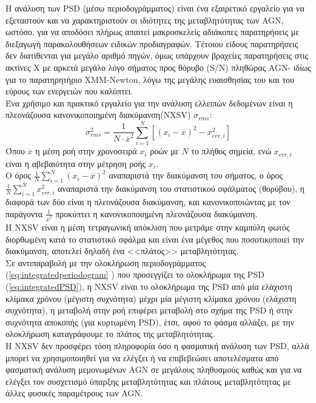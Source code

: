 Η ανάλυση των \textlatin{PSD} (μέσω περιοδογράμματος) είναι ένα εξαιρετικό εργαλείο για να εξεταστούν και να χαρακτηριστούν οι ιδιότητες της μεταβλητότητας των \textlatin{AGN}, ωστόσο, για να αποδόσει πλήρως απαιτεί μακροσκελείς αδιάκοπες παρατηρήσεις με διεξαγωγή παρακολουθήσεων ειδικών προδιαγραφών. Τέτοιου είδους παρατηρήσεις δεν διατίθενται για μεγάλο αριθμό πηγών, όμως υπάρχουν βραχείες παρατηρήσεις στις ακτίνες Χ με αρκετά μεγάλο λόγο σήματος προς θόρυβο (\textlatin{S/N}) πληθώρας \textlatin{AGN}- ιδίως για το παρατηρητήριο \textlatin{XMM-Newton}, λόγω της μεγάλης ευαισθησίας του και του εύρους των ενεργειών που καλύπτει. \\
Ένα χρήσιμο και πρακτικό εργαλείο για την ανάλυση ελλειπών δεδομένων είναι η πλεονάζουσα κανονικοποιημένη διακύμανση(\textlatin{NXSV}) $\sigma_{rms}$:
\begin{equation} \sigma^2_{rms} = \frac{1}{N \cdot {\overline{x}}^2 }   \sum_{i=1}^{N}  [ (x_i -\overline x)^2  - x_{err, i}^2]  \label{eq:NXSVformula}\end{equation}
Όπου $\overline x$ η μέση ροή στην χρονοσειρά $x_i$ ροών με $Ν$ το πλήθος σημεία, ενώ $x_{err, i}$ είναι η αβεβαιότητα στην μέτρηση ροής $x_i$. \\
Ο όρος $ \frac{1}{N }   \sum_{i=1}^{N}   (x_i -\overline x)^2  $ αναπαριστά την διακύμανση του σήματος, ο όρος $ \frac{1}{N }   \sum_{i=1}^{N}  x_{err, i}^2 $ αναπαριστά την διακύμανση του στατιστικού σφάλματος (θορύβου), η διαφορά των δύο είναι η πλεονάζουσα διακύμανση, και κανονικοποιώντας με τον παράγοντα $ \frac{1}{{\overline{x}}^2 }$ προκύπτει η κανονικοποιημένη πλεονάζουσα διακύμανση.\\
Η \textlatin{NXSV} είναι η μέση τετραγωνική απόκλιση που μετράμε στην καμπύλη φωτός διορθωμένη κατά το στατιστικό σφάλμα και είναι ένα μέγεθος που ποσοτικοποιεί την διακύμανση, αποτελεί δηλαδή ένα <<πλάτος>> μεταβλητότητας\cite{2004ApJ...611...93P}.\\
Σε αντιπαραβολή με την ολοκλήρωση περιοδογράμματος (\ref{eq:integratedperiodogram} ) που προσεγγίζει το ολοκλήρωμα της \textlatin{PSD} (\ref{eq:integratedPSD}), η \textlatin{NXSV} είναι το ολοκλήρωμα της \textlatin{PSD} από μία ελάχιστη κλίμακα χρόνου (μέγιστη συχνότητα) μέχρι μία μέγιστη κλίμακα χρόνου (ελάχιστη συχνότητα), η μεταβολή στην ροή επιφέρει μεταβολή στο σχήμα της \textlatin{PSD} ή στην συχνότητα αποκοπής (για κυρτωμένη \textlatin{PSD}), έτσι, αφού το φάσμα αλλάζει, με την ολοκλήρωση καταγράφουμε το πλάτος της μεταβλητότητας.\\  
Η \textlatin{NXSV} δεν προσφέρει τόση πληροφορία όσο η φασματική ανάλυση των \textlatin{PSD}, αλλά μπορεί να χρησιμοποιηθεί για να ελέγξει ή να επιβεβεώσει αποτελέσματα από φασματική ανάλυση μεμονωμένων \textlatin{AGN} σε μεγάλους πληθυσμούς καθώς και για να ελέγξει τον συσχετισμό ύπαρξης μεταβλητότητας και πλάτους μεταβλητότητας με άλλες φυσικές παραμέτρους των \textlatin{AGN}\cite{2012A&A...542A..83P}.

